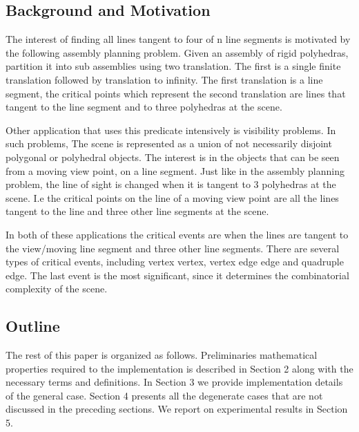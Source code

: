 \documentclass[11pt]{article}
\begin{document}
\subsection{Background and Motivation}
The interest of finding all lines tangent to four of n line segments is 
motivated by the following assembly planning problem. Given an assembly of 
rigid polyhedras, partition it into sub assemblies using two translation.
The first is a single finite translation followed by translation to infinity.
The first translation is a line segment, the critical points which represent 
the second translation are lines that tangent to the line segment and to three
polyhedras at the scene.

Other application that uses this predicate intensively is visibility problems.
In such problems, The scene is represented as a union of not necessarily 
disjoint polygonal or polyhedral objects. The  interest is in the objects that 
can be seen from a moving view point, on a line segment. Just like in the 
assembly planning problem, the line of sight is changed when it is tangent to 
3 polyhedras at the scene. I.e the critical points on the line of a moving view 
point are all the lines tangent to the line and three other line segments 
at the scene.

In both of these applications the critical events are when the lines are tangent
to the view/moving line segment and three other line segments. There are several
types of critical events, including vertex vertex, vertex edge edge and 
quadruple edge. The last event is the most significant, since it determines the
combinatorial complexity of the scene. 

\label{ssec:background}

\subsection{Outline}
\label{ssec:outline}

The rest of this paper is organized as follows. Preliminaries mathematical 
properties required to the implementation is described in Section 2 along with
the necessary terms and definitions. In
Section 3 we provide implementation details of the general case. Section 4 
presents all the degenerate cases that are not discussed in the preceding 
sections. We report on experimental results in Section 5.
\end{document}
